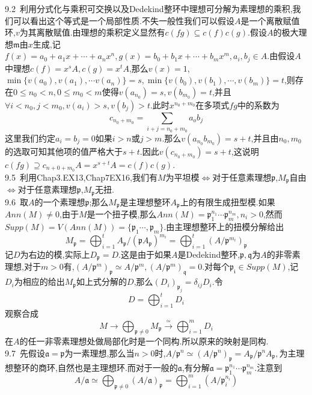 \documentclass[b5paper]{ctexart}
\begin{document}
\pagestyle{plain}
\noindent
{}
9.2~利用分式化与乘积可交换以及Dedekind整环中理想可分解为素理想的乘积,我们可以看出这个等式是一个局部性质.不失一般性我们可以假设$A$是一个离散赋值环,$v$为其离散赋值.由理想的乘积定义显然有$c(fg)\subseteq c(f)c(g)$.假设$A$的极大理想$\mathfrak{m}$由$x$生成,记$f(x)=a_0+a_1x+\cdots+a_nx^n,g(x)=b_0+b_1x+\cdots+b_mx^m,a_i,b_j\in A$.由假设$A$中理想$c(f)=x^sA,c(g)=x^tA$,那么$v(x)=1$,$\min\{v(a_0),v(a_1),\cdots v(a_n)\}=s,\min\{v(b_0),v(b_1),\cdots,v(b_m)\}=t$,则存在$0\leq n_0<n,0\leq m_0<m$使得$v(a_{n_0})=s,v(b_{m_0})=t$,并且$\forall i<n_0,j<m_0,v(a_i)>s,v(b_j)>t$.此时$x^{n_0+m_0}$在多项式$fg$中的系数为
\[c_{n_0+m_0}=\sum_{i+j=n_0+m_0}a_ob_j\]
这里我们约定$a_i=b_j=0$如果$i>n$或$j>m$.那么$v(a_{n_0}b_{m_0})=s+t$,并且由$n_0,m_0$的选取可知其他项的值严格大于$s+t$.因此$v(c_{n_0+m_0})=s+t$,这说明$c(fg)\supseteq c_{n+0+m_0}A=x^{s+t}A=c(f)c(g)$.\\
9.5~利用Chap3.EX13,Chap7EX16,我们有$M$为平坦模$\Leftrightarrow$对于任意素理想$\mathfrak{p}$,$M_{\mathfrak{p}}$自由$\Leftrightarrow$对于任意素理想$\mathfrak{p}$,$M_{\mathfrak{p}}$无扭.\\
9.6~取$A$的一个素理想$\mathfrak{p}$;那么$M_{\mathfrak{p}}$是主理想整环$A_{\mathfrak{p}}$上的有限生成扭型模.如果$Ann(M)\neq 0$,由于$M$是一个扭子模,那么$Ann(M)=\mathfrak{p}_1^{n_1}\cdots \mathfrak{p}_m^{n_m},n_i>0$,然而$Supp(M)=V(Ann(M))=\{\mathfrak{p}_1\cdots,\mathfrak{p}_m\}$.由主理想整环上的扭模分解给出
\[M_{\mathfrak{p}}=\bigoplus_{i=1}^tA_{\mathfrak{p}}/(\mathfrak{p}A_{\mathfrak{p}})^{m_i}=\bigoplus_{i=1}^t(A/\mathfrak{p}^{m_i})_{\mathfrak{p}}\]
记$D$为右边的模,实际上$D_{\mathfrak{p}}=D$.这是由于如果$A$是Dedekind整环,$\mathfrak{p},\mathfrak{q}$为$A$的非零素理想,对于$m>0$有,$(A/\mathfrak{p}^m)_{\mathfrak{p}}\simeq A/\mathfrak{p}^m,(A/\mathfrak{p}^m)_{\mathfrak{q}}=0$.对每个$\mathfrak{p_i}\in Supp(M)$,记$D_i$为相应的给出$M_{\mathfrak{p}}$如上式分解的$D$,那么$(D_i)_{\mathfrak{p}_j}=\delta_{ij}D_i.$令
\[D=\bigoplus_{i=1}^tD_i\]
观察合成
\[M\to \bigoplus_{\mathfrak{p}\neq 0}M_{\mathfrak{p}}\xrightarrow{\simeq}\bigoplus_{i=1}^mD_i\]
在$A$的任一非零素理想处做局部化时是一个同构.所以原来的映射是同构.\\
9.7~先假设$\mathfrak{a}=\mathfrak{p}$为一素理想,那么当$n>0$时,$A/\mathfrak{p}^n\simeq (A/\mathfrak{p}^n)_{\mathfrak{p}}=A_{\mathfrak{p}}/\mathfrak{p}^nA_{\mathfrak{p}},$为主理想整环的商环,自然也是主理想环.而对于一般的$\mathfrak{a}$,有分解$\mathfrak{a}=\mathfrak{p}_1^{n_1}\cdots \mathfrak{p}_m^{n_m}$.注意到
\[A/\mathfrak{a}\simeq\bigoplus_{\mathfrak{p}\neq 0}(A/\mathfrak{a})_{\mathfrak{p}}=\bigoplus_{i=1}^{m}(A/\mathfrak{p}_i^{n_i})\]
\end{document}
